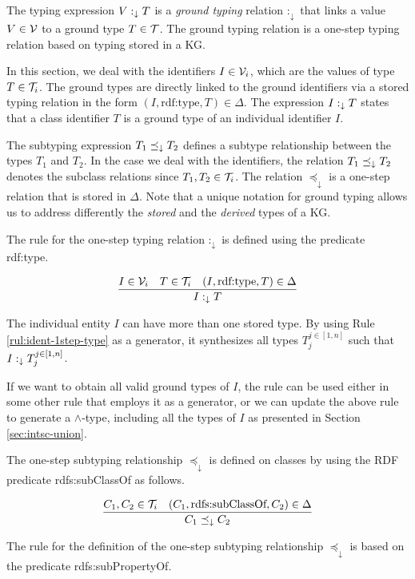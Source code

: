 \documentclass[runningheads]{llncs}
\newcommand{\darr}{\downarrow}
\newcommand{\V}{{\cal V}}
\newcommand{\T}{{\cal T}}
\begin{document}
The typing expression $V:_\darr\/T$ is a \emph{ground typing} relation
$:_\darr$ that links a value $V\in\V$ to a ground type $T\in\T$. The
ground typing relation is a one-step typing relation based on typing
stored in a KG.

In this section, we deal with the identifiers $I\in\V_i$, which are the
values of type $T\in\T_i$. The ground types are directly linked to the
ground identifiers via a stored typing relation in the form
$(I,\text{rdf:type},T)\in\Delta$. The expression $I:_\darr\/T$ states that a
class identifier $T$ is a ground type of an individual identifier $I$.

The subtyping expression $T_1\preceq_\darr\/T_2$ defines a subtype
relationship between the types $T_1$ and $T_2$. In the case we deal
with the identifiers, the relation $T_1\preceq_\darr\/T_2$ denotes the
subclass relations since $T_1,T_2\in\T_i$. The relation $\preceq_\darr$ is
a one-step relation that is stored in $\Delta$. Note that a unique
notation for ground typing allows us to address differently the
\emph{stored} and the \emph{derived} types of a KG.

The rule for the one-step typing relation $:_\darr$ is defined using the
predicate rdf:type.

\begin{equation}
\label{rul:ident-1step-type}
\dfrac{I\in\V_i\quad T\in\T_i\quad (I,\text{rdf:type},T)\in\D}
      {I :_\darr T}
\end{equation}

The individual entity $I$ can have more than one stored type. By
using Rule \ref{rul:ident-1step-type} as a generator, it synthesizes
all types $T_j^{j\in[1,n]}$ such that $I:_\darr\/T_j^{j\in[1,n]}$.

If we want to obtain all valid ground types of $I$, the rule can be
used either in some other rule that employs it as a generator, or we
can update the above rule to generate a $\land$-type, including all
the types of $I$ as presented in Section \ref{sec:intsc-union}.

The one-step subtyping relationship $\preceq_\darr$ is defined on
classes by using the RDF predicate rdfs:sub\-ClassOf as follows.

\begin{equation}
\label{rul:ident-1step-subtype}
\dfrac{C_1,C_2\in\T_i \quad (C_1,\text{rdfs:subClassOf},C_2)\in\D}
{C_1 \preceq_\darr\/C_2}
\end{equation}

The rule for the definition of the one-step subtyping relationship
$\preceq_\darr$ is based on the predicate rdfs:subPropertyOf.
\end{document}
